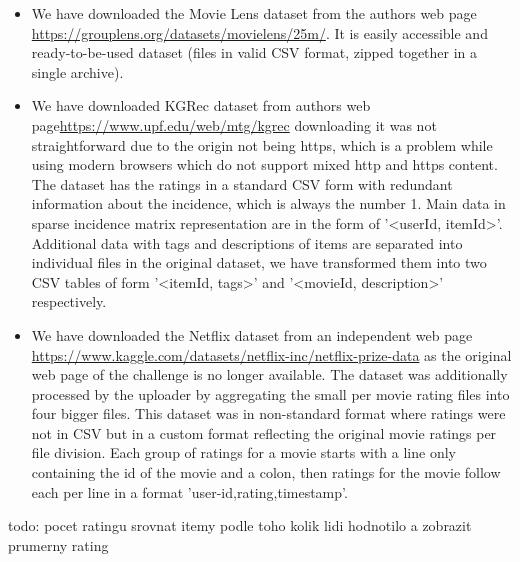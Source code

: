 \begin{itemize}
    \item We have downloaded the Movie Lens dataset from the authors web page \newline \href{https://grouplens.org/datasets/movielens/25m/}{https://grouplens.org/datasets/movielens/25m/}. It is easily accessible and ready-to-be-used dataset (files in valid CSV format, zipped together in a single archive).
    
    \item We have downloaded KGRec dataset from authors web page\newline \href{https://www.upf.edu/web/mtg/kgrec}{https://www.upf.edu/web/mtg/kgrec}
    \newline
    downloading it was not straightforward due to the origin not being https, which is a problem while using modern browsers which do not support mixed http and https content. The dataset has the ratings in a standard CSV form with redundant information about the incidence, which is always the number 1. Main data in sparse incidence matrix representation are in the form of '\textless userId, itemId\textgreater'. Additional data with tags and descriptions of items are separated into individual files in the original dataset, we have transformed them into two CSV tables of form '\textless itemId, tags\textgreater' and '\textless movieId, description\textgreater' respectively.
    
    \item We have downloaded the Netflix dataset from an independent web page
    \newline
    \href{https://www.kaggle.com/datasets/netflix-inc/netflix-prize-data}{https://www.kaggle.com/datasets/netflix-inc/netflix-prize-data}
    \newline
    as the original web page of the challenge is no longer available. The dataset was additionally processed by the uploader by aggregating the small per movie rating files into four bigger files. This dataset was in non-standard format where ratings were not in CSV but in a custom format reflecting the original movie ratings per file division. Each group of ratings for a movie starts with a line only containing the id of the movie and a colon, then ratings for the movie follow each per line in a format 'user-id,rating,timestamp'.
\end{itemize}


todo: pocet ratingu
srovnat itemy podle toho kolik lidi hodnotilo a zobrazit prumerny rating






